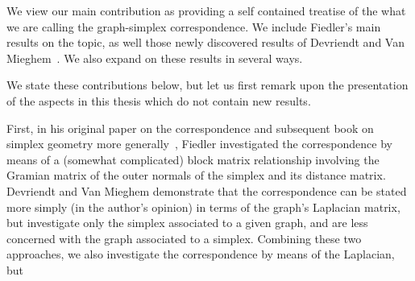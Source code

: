 We view our main contribution as providing a self contained treatise  of the what we are  calling the graph-simplex correspondence. We include Fiedler's main results  on the topic, as well those newly discovered results of Devriendt and Van Mieghem~\cite{devriendt2018simplex}. We also expand on these results in several ways. 

We state these contributions below, but let us first remark upon the  presentation of the aspects in this thesis which do not contain new results.  

First, in his original paper on the correspondence and subsequent book on simplex geometry more generally~\cite{fiedler2011matrices}, Fiedler  investigated the correspondence by means of a (somewhat complicated) block matrix relationship involving the Gramian matrix of the outer normals of the simplex and its distance matrix. Devriendt  and Van Mieghem demonstrate that the correspondence can be stated more simply (in the author's opinion) in terms of the graph's Laplacian matrix, but investigate only the simplex associated to a given graph, and are less concerned with the graph associated to a simplex. Combining these two approaches, we also investigate the correspondence by means of the Laplacian, but 

